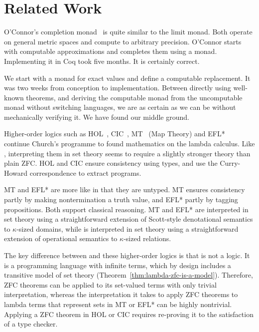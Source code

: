\section{Related Work}

O'Connor's completion monad~\cite{cit:oconnor-2008-real-numbers} is quite similar to the limit monad. Both operate on general metric spaces and compute to arbitrary precision. O'Connor starts with computable approximations and completes them using a monad. Implementing it in Coq took five months. It is certainly correct.

We start with a monad for exact values and define a computable replacement. It was two weeks from conception to implementation. Between directly using well-known theorems, and deriving the computable monad from the uncomputable monad without switching languages, we are as certain as we can be without mechanically verifying it. We have found our middle ground.

Higher-order logics such as HOL~\cite{leivant-1994-hol}, CIC~\cite{cit:book-coqart}, MT~\cite{cit:berline-1997-mt} (Map Theory) and EFL*~\cite{cit:myhill-1989-efl} continue Church's programme to found mathematics on the lambda calculus. Like \targetlang, interpreting them in set theory seems to require a slightly stronger theory than plain ZFC. HOL and CIC ensure consistency using types, and use the Curry-Howard correspondence to extract programs.

MT and EFL* are more like \targetlang in that they are untyped. MT ensures consistency partly by making nontermination a truth value, and EFL* partly by tagging propositions.
Both support classical reasoning.
MT and EFL* are interpreted in set theory using a straightforward extension of Scott-style denotational semantics to $\kappa$-sized domains, while \targetlang is interpreted in set theory using a straightforward extension of operational semantics to $\kappa$-sized relations.

The key difference between \targetlang and these higher-order logics is that \targetlang is not a logic. It is a programming language with infinite terms, which by design includes a transitive model of set theory (Theorem~\ref{thm:lambda-zfc-is-a-model}). Therefore, ZFC theorems can be applied to its set-valued terms with only trivial interpretation, whereas the interpretation it takes to apply ZFC theorems to lambda terms that represent sets in MT or EFL* can be highly nontrivial. Applying a ZFC theorem in HOL or CIC requires re-proving it to the satisfaction of a type checker.

